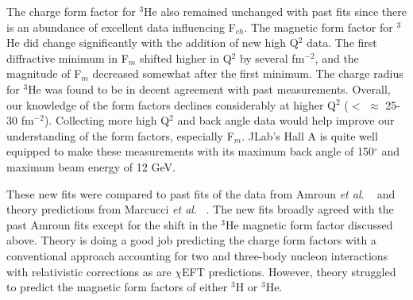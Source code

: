 The charge form factor for $^3$He also remained unchanged with past fits since there is an abundance of excellent data influencing F$_{ch}$. The magnetic form factor for $^3$He did change significantly with the addition of new high Q$^2$ data. The first diffractive minimum in F$_m$ shifted higher in Q$^2$ by several fm$^{-2}$, and the magnitude of F$_m$ decreased somewhat after the first minimum. The charge radius for $^3$He was found to be in decent agreement with past measurements. Overall, our knowledge of the form factors declines considerably at higher Q$^2$ ($<$ $\approx$ 25-30 fm$^{-2}$). Collecting more high Q$^2$ and back angle data would help improve our understanding of the form factors, especially F$_m$. JLab's Hall A is quite well equipped to make these measurements with its maximum back angle of 150$^{\circ}$ and maximum beam energy of 12 GeV.

These new fits were compared to past fits of the data from Amroun \textit{et al}. ~\cite{Article:Amroun} and theory predictions from Marcucci \textit{et al}. ~\cite{Article:Marcucci}. The new fits broadly agreed with the past Amroun fits except for the shift in the $^3$He magnetic form factor discussed above. Theory is doing a good job predicting the charge form factors with a conventional approach accounting for two and three-body nucleon interactions with relativistic corrections as are $\chi$EFT predictions. However, theory struggled to predict the magnetic form factors of either $^3$H or $^3$He. 

